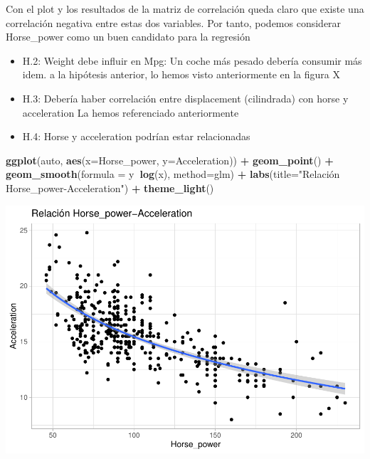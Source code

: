 \documentclass[
]{article}
\newenvironment{Shaded}{\begin{snugshade}}{\end{snugshade}}
\newcommand{\DataTypeTok}[1]{\textcolor[rgb]{0.13,0.29,0.53}{#1}}
\newcommand{\KeywordTok}[1]{\textcolor[rgb]{0.13,0.29,0.53}{\textbf{#1}}}
\newcommand{\NormalTok}[1]{#1}
\newcommand{\OperatorTok}[1]{\textcolor[rgb]{0.81,0.36,0.00}{\textbf{#1}}}
\newcommand{\StringTok}[1]{\textcolor[rgb]{0.31,0.60,0.02}{#1}}
\begin{document}
Con el plot y los resultados de la matriz de correlación queda claro que
existe una correlación negativa entre estas dos variables. Por tanto,
podemos considerar Horse\_power como un buen candidato para la regresión

\begin{itemize}
\item
  H.2: Weight debe influir en Mpg: Un coche más pesado debería consumir
  más idem. a la hipótesis anterior, lo hemos visto anteriormente en la
  figura X
\item
  H.3: Debería haber correlación entre displacement (cilindrada) con
  horse y acceleration La hemos referenciado anteriormente
\item
  H.4: Horse y acceleration podrían estar relacionadas
\end{itemize}

\begin{Shaded}
\begin{Highlighting}[]
\KeywordTok{ggplot}\NormalTok{(auto, }\KeywordTok{aes}\NormalTok{(}\DataTypeTok{x=}\NormalTok{Horse_power, }\DataTypeTok{y=}\NormalTok{Acceleration)) }\OperatorTok{+}
\StringTok{  }\KeywordTok{geom_point}\NormalTok{() }\OperatorTok{+}
\StringTok{  }\KeywordTok{geom_smooth}\NormalTok{(}\DataTypeTok{formula =}\NormalTok{ y}\OperatorTok{~}\KeywordTok{log}\NormalTok{(x), }\DataTypeTok{method=}\NormalTok{glm) }\OperatorTok{+}
\StringTok{  }\KeywordTok{labs}\NormalTok{(}\DataTypeTok{title=}\StringTok{"Relación Horse_power-Acceleration"}\NormalTok{) }\OperatorTok{+}
\StringTok{  }\KeywordTok{theme_light}\NormalTok{()}
\end{Highlighting}
\end{Shaded}

\begin{center}\includegraphics{EDA_files/figure-latex/unnamed-chunk-28-1} \end{center}
\end{document}
